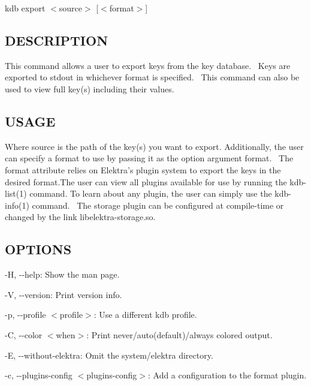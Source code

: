 {\ttfamily kdb export $<$source$>$ \mbox{[}$<$format$>$\mbox{]}}~\newline


\subsection*{D\+E\+S\+C\+R\+I\+P\+T\+I\+ON}

This command allows a user to export keys from the key database.~\newline
 Keys are exported to {\ttfamily stdout} in whichever format is specified.~\newline
 This command can also be used to view full key(s) including their values.~\newline


\subsection*{U\+S\+A\+GE}

Where {\ttfamily source} is the path of the key(s) you want to export. Additionally, the user can specify a format to use by passing it as the option argument {\ttfamily format}.~\newline
 The {\ttfamily format} attribute relies on Elektra’s plugin system to export the keys in the desired format.\+The user can view all plugins available for use by running the kdb-\/list(1) command. To learn about any plugin, the user can simply use the kdb-\/info(1) command.~\newline
 The {\ttfamily storage} plugin can be configured at compile-\/time or changed by the link {\ttfamily libelektra-\/storage.\+so}.

\subsection*{O\+P\+T\+I\+O\+NS}


\begin{DoxyItemize}
\item {\ttfamily -\/H}, {\ttfamily -\/-\/help}\+: Show the man page.
\item {\ttfamily -\/V}, {\ttfamily -\/-\/version}\+: Print version info.
\item {\ttfamily -\/p}, {\ttfamily -\/-\/profile $<$profile$>$}\+: Use a different kdb profile.
\item {\ttfamily -\/C}, {\ttfamily -\/-\/color $<$when$>$}\+: Print never/auto(default)/always colored output.
\item {\ttfamily -\/E}, {\ttfamily -\/-\/without-\/elektra}\+: Omit the {\ttfamily system/elektra} directory.
\item {\ttfamily -\/c}, {\ttfamily -\/-\/plugins-\/config $<$plugins-\/config$>$}\+: Add a configuration to the format plugin.
\end{DoxyItemize}

